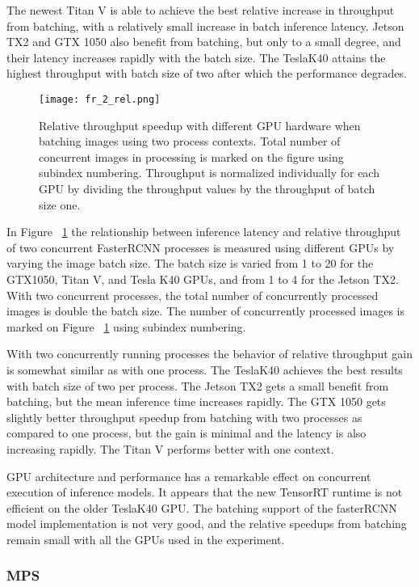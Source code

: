 \documentclass[sigconf]{acmart}
\begin{document}
The newest Titan V is able to achieve the best relative increase in throughput from batching, with a relatively small increase in batch inference latency. Jetson TX2 and GTX 1050 also benefit from batching, but only to a small degree, and their latency increases rapidly with the batch size. The TeslaK40 attains the highest throughput with batch size of two after which the performance degrades.

\begin{figure}[t]
\centering
\texttt{[image: fr\_2\_rel.png]}
\caption{Relative throughput speedup with different GPU hardware when batching images using two process contexts. Total number of concurrent images in processing is marked on the figure using subindex numbering. Throughput is normalized individually for each GPU by dividing the throughput values by the throughput of batch size one.}
\label{fig:fr_2_rel}
\end{figure}

In Figure ~\ref{fig:fr_2_rel} the relationship between inference latency and relative throughput of two concurrent FasterRCNN processes is measured using different GPUs by varying the image batch size. The batch size is varied from 1 to 20 for the GTX1050, Titan V, and Tesla K40 GPUs, and from 1 to 4 for the Jetson TX2. With two concurrent processes, the total number of concurrently processed images is double the batch size. The number of concurrently processed images is marked on Figure ~\ref{fig:fr_2_rel} using subindex numbering.

With two concurrently running processes the behavior of relative throughput gain is somewhat similar as with one process. The TeslaK40 achieves the best results with batch size of two per process. The Jetson TX2 gets a small benefit from batching, but the mean inference time increases rapidly. The GTX 1050 gets slightly better throughput speedup from batching with two processes as compared to one process, but the gain is minimal and the latency is also increasing rapidly. The Titan V performs better with one context.

GPU architecture and performance has a remarkable effect on concurrent execution of inference models. It appears that the new TensorRT runtime is not efficient on the older TeslaK40 GPU. The batching support of the fasterRCNN model implementation is not very good, and the relative speedups from batching remain small with all the GPUs used in the experiment.

\subsubsection{MPS}
\end{document}
